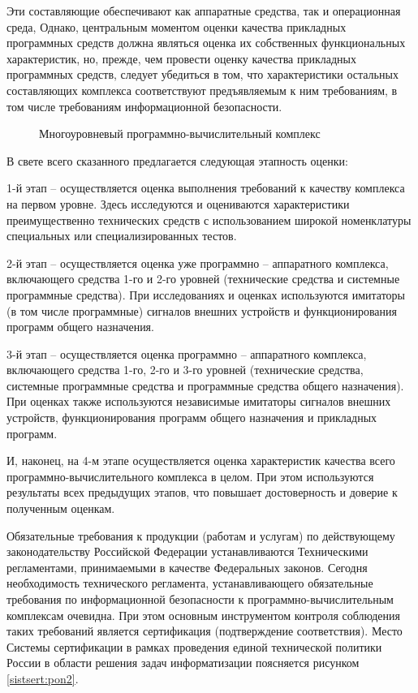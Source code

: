 Эти составляющие обеспечивают как аппаратные средства, так и операционная среда, Однако, центральным моментом оценки качества прикладных программных средств должна являться оценка их собственных функциональных характеристик, но, прежде, чем провести оценку качества прикладных программных средств, следует убедиться в том, что характеристики остальных составляющих комплекса соответствуют предъявляемым к ним требованиям, в том числе требованиям информационной безопасности.

\begin{figure}[h!]
\caption{Многоуровневый программно-вычислительный комплекс}
\label{mnogour_pvk:pon1}
\end{figure}

В свете всего сказанного предлагается следующая этапность оценки:

1-й этап – осуществляется оценка выполнения требований к качеству комплекса на первом уровне. Здесь исследуются и оцениваются характеристики преимущественно технических средств с использованием широкой номенклатуры специальных или специализированных тестов.

2-й этап – осуществляется оценка уже программно – аппаратного комплекса, включающего средства 1-го и 2-го уровней (технические средства и системные программные средства). При исследованиях и оценках используются имитаторы (в том числе программные) сигналов внешних устройств и функционирования программ общего назначения.

3-й этап – осуществляется оценка программно – аппаратного комплекса, включающего средства 1-го, 2-го и 3-го уровней (технические средства, системные программные средства и программные средства общего назначения). При оценках также используются независимые имитаторы сигналов внешних устройств, функционирования программ общего назначения и прикладных программ.

И, наконец, на 4-м этапе осуществляется оценка характеристик качества всего программно-вычислительного комплекса в целом. При этом используются результаты всех предыдущих этапов, что повышает достоверность и доверие к полученным оценкам.

Обязательные требования к продукции (работам и услугам) по действующему законодательству Российской Федерации устанавливаются Техническими регламентами, принимаемыми в качестве Федеральных законов. Сегодня необходимость технического регламента, устанавливающего обязательные требования по информационной безопасности к программно-вычислительным комплексам очевидна. При этом основным инструментом контроля соблюдения таких требований является сертификация (подтверждение соответствия). Место Системы сертификации в рамках проведения единой технической политики России в области решения задач информатизации поясняется рисунком \ref{sistsert:pon2}.

